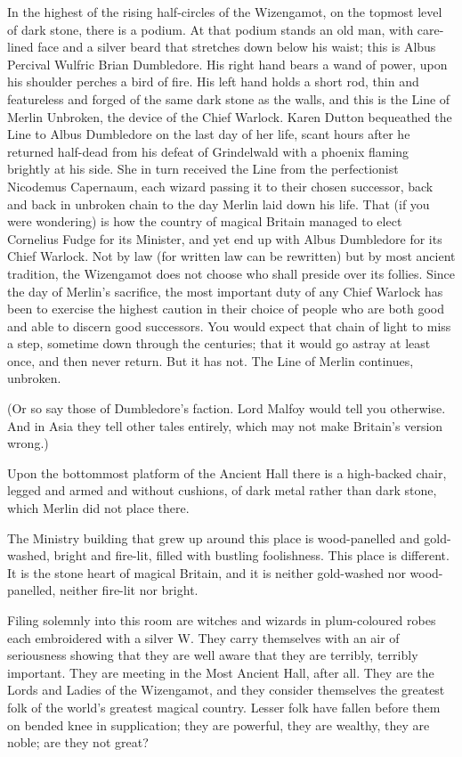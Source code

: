 In the highest of the rising half-circles of the Wizengamot, on the topmost
level of dark stone, there is a podium. At that podium stands an old man, with
care-lined face and a silver beard that stretches down below his waist; this is
Albus Percival Wulfric Brian Dumbledore. His right hand bears a wand of power,
upon his shoulder perches a bird of fire. His left hand holds a short rod, thin
and featureless and forged of the same dark stone as the walls, and this is the
Line of Merlin Unbroken, the device of the Chief Warlock. Karen Dutton
bequeathed the Line to Albus Dumbledore on the last day of her life, scant
hours after he returned half-dead from his defeat of Grindelwald with a phoenix
flaming brightly at his side. She in turn received the Line from the
perfectionist Nicodemus Capernaum, each wizard passing it to their chosen
successor, back and back in unbroken chain to the day Merlin laid down his
life. That (if you were wondering) is how the country of magical Britain
managed to elect Cornelius Fudge for its Minister, and yet end up with Albus
Dumbledore for its Chief Warlock. Not by law (for written law can be rewritten)
but by most ancient tradition, the Wizengamot does not choose who shall preside
over its follies. Since the day of Merlin’s sacrifice, the most important duty
of any Chief Warlock has been to exercise the highest caution in their choice
of people who are both good and able to discern good successors. You would
expect that chain of light to miss a step, sometime down through the centuries;
that it would go astray at least once, and then never return. But it has not.
The Line of Merlin continues, unbroken.

(Or so say those of Dumbledore’s faction. Lord Malfoy would tell you otherwise.
And in Asia they tell other tales entirely, which may not make Britain’s
version wrong.)

Upon the bottommost platform of the Ancient Hall there is a high-backed chair,
legged and armed and without cushions, of dark metal rather than dark stone,
which Merlin did not place there.

The Ministry building that grew up around this place is wood-panelled and
gold-washed, bright and fire-lit, filled with bustling foolishness. This place
is different. It is the stone heart of magical Britain, and it is neither
gold-washed nor wood-panelled, neither fire-lit nor bright.

Filing solemnly into this room are witches and wizards in plum-coloured robes
each embroidered with a silver W\@. They carry themselves with an air of
seriousness showing that they are well aware that they are terribly, terribly
important. They are meeting in the Most Ancient Hall, after all. They are the
Lords and Ladies of the Wizengamot, and they consider themselves the greatest
folk of the world’s greatest magical country. Lesser folk have fallen before
them on bended knee in supplication; they are powerful, they are wealthy, they
are noble; are they not great?

